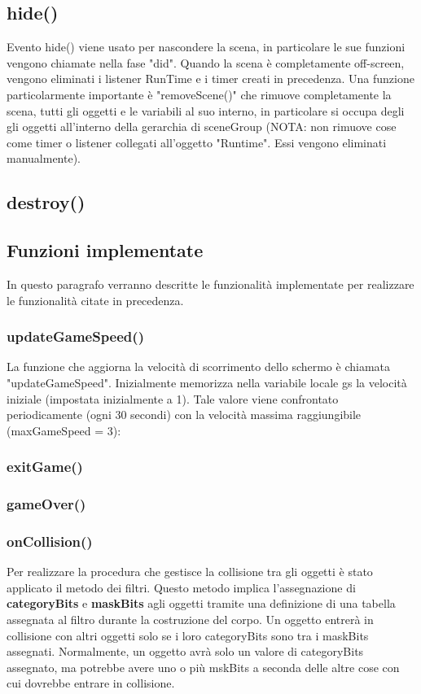 \documentclass[12pt]{article}
\begin{document}
\subsection{hide()}
Evento hide() viene usato per nascondere la scena, in particolare le sue funzioni vengono chiamate nella fase "did". Quando la scena è completamente off-screen, vengono eliminati i listener RunTime e i timer creati in precedenza. Una funzione particolarmente importante è "removeScene()" che rimuove completamente la scena, tutti gli oggetti e le variabili al suo interno,
in particolare si occupa degli gli oggetti all'interno della gerarchia di sceneGroup (NOTA: non rimuove cose come timer o listener collegati all'oggetto "Runtime". Essi vengono eliminati manualmente).

\subsection{destroy()}

\subsection{Funzioni implementate}
In questo paragrafo verranno descritte le funzionalità implementate per realizzare le funzionalità citate in precedenza.
\subsubsection{updateGameSpeed()}
La funzione che aggiorna la velocità di scorrimento dello schermo è chiamata "updateGameSpeed". Inizialmente memorizza nella variabile 
locale gs la velocità iniziale (impostata inizialmente a 1). Tale valore viene confrontato periodicamente (ogni 30 secondi)
con la velocità massima raggiungibile (maxGameSpeed = 3):   



\subsubsection{exitGame()}

\subsubsection{gameOver()}

\subsubsection{onCollision()}
Per realizzare la procedura che gestisce la collisione tra gli oggetti è stato applicato il metodo dei filtri. 
Questo metodo implica l'assegnazione di \textbf{categoryBits} e \textbf{maskBits} agli oggetti tramite una definizione di una 
tabella assegnata al filtro durante la costruzione del corpo. Un oggetto entrerà in collisione con altri oggetti solo se i loro 
categoryBits sono tra i maskBits assegnati. Normalmente, un oggetto avrà solo un valore di categoryBits assegnato, ma potrebbe avere 
uno o più mskBits a seconda delle altre cose con cui dovrebbe entrare in collisione.
\end{document}
